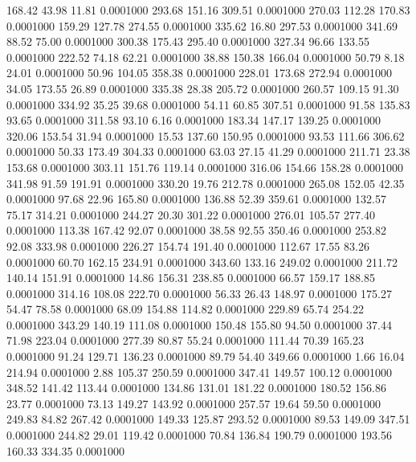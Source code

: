  168.42   43.98   11.81   0.0001000
 293.68  151.16  309.51   0.0001000
 270.03  112.28  170.83   0.0001000
 159.29  127.78  274.55   0.0001000
 335.62   16.80  297.53   0.0001000
 341.69   88.52   75.00   0.0001000
 300.38  175.43  295.40   0.0001000
 327.34   96.66  133.55   0.0001000
 222.52   74.18   62.21   0.0001000
  38.88  150.38  166.04   0.0001000
  50.79    8.18   24.01   0.0001000
  50.96  104.05  358.38   0.0001000
 228.01  173.68  272.94   0.0001000
  34.05  173.55   26.89   0.0001000
 335.38   28.38  205.72   0.0001000
 260.57  109.15   91.30   0.0001000
 334.92   35.25   39.68   0.0001000
  54.11   60.85  307.51   0.0001000
  91.58  135.83   93.65   0.0001000
 311.58   93.10    6.16   0.0001000
 183.34  147.17  139.25   0.0001000
 320.06  153.54   31.94   0.0001000
  15.53  137.60  150.95   0.0001000
  93.53  111.66  306.62   0.0001000
  50.33  173.49  304.33   0.0001000
  63.03   27.15   41.29   0.0001000
 211.71   23.38  153.68   0.0001000
 303.11  151.76  119.14   0.0001000
 316.06  154.66  158.28   0.0001000
 341.98   91.59  191.91   0.0001000
 330.20   19.76  212.78   0.0001000
 265.08  152.05   42.35   0.0001000
  97.68   22.96  165.80   0.0001000
 136.88   52.39  359.61   0.0001000
 132.57   75.17  314.21   0.0001000
 244.27   20.30  301.22   0.0001000
 276.01  105.57  277.40   0.0001000
 113.38  167.42   92.07   0.0001000
  38.58   92.55  350.46   0.0001000
 253.82   92.08  333.98   0.0001000
 226.27  154.74  191.40   0.0001000
 112.67   17.55   83.26   0.0001000
  60.70  162.15  234.91   0.0001000
 343.60  133.16  249.02   0.0001000
 211.72  140.14  151.91   0.0001000
  14.86  156.31  238.85   0.0001000
  66.57  159.17  188.85   0.0001000
 314.16  108.08  222.70   0.0001000
  56.33   26.43  148.97   0.0001000
 175.27   54.47   78.58   0.0001000
  68.09  154.88  114.82   0.0001000
 229.89   65.74  254.22   0.0001000
 343.29  140.19  111.08   0.0001000
 150.48  155.80   94.50   0.0001000
  37.44   71.98  223.04   0.0001000
 277.39   80.87   55.24   0.0001000
 111.44   70.39  165.23   0.0001000
  91.24  129.71  136.23   0.0001000
  89.79   54.40  349.66   0.0001000
   1.66   16.04  214.94   0.0001000
   2.88  105.37  250.59   0.0001000
 347.41  149.57  100.12   0.0001000
 348.52  141.42  113.44   0.0001000
 134.86  131.01  181.22   0.0001000
 180.52  156.86   23.77   0.0001000
  73.13  149.27  143.92   0.0001000
 257.57   19.64   59.50   0.0001000
 249.83   84.82  267.42   0.0001000
 149.33  125.87  293.52   0.0001000
  89.53  149.09  347.51   0.0001000
 244.82   29.01  119.42   0.0001000
  70.84  136.84  190.79   0.0001000
 193.56  160.33  334.35   0.0001000
